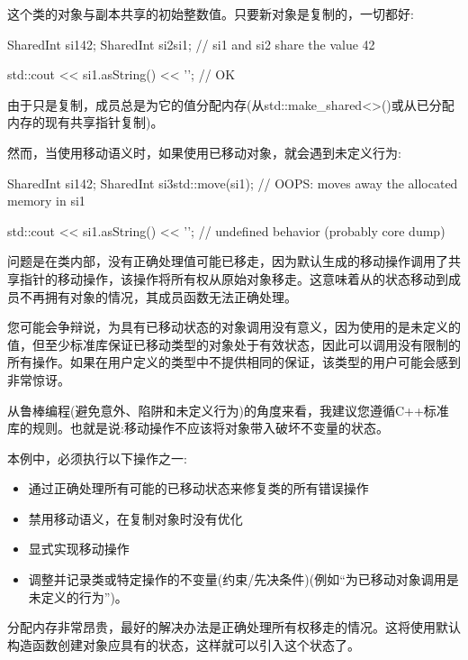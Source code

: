 这个类的对象与副本共享的初始整数值。只要新对象是复制的，一切都好:

\begin{cppcode}
SharedInt si1{42};
SharedInt si2{si1}; // si1 and si2 share the value 42

std::cout << si1.asString() << '\n'; // OK
\end{cppcode}

由于只是复制，成员总是为它的值分配内存(从std::make_shared<>()或从已分配内存的现有共享指针复制)。

然而，当使用移动语义时，如果使用已移动对象，就会遇到未定义行为:

\begin{cppcode}
SharedInt si1{42};
SharedInt si3{std::move(si1)}; // OOPS: moves away the allocated memory in si1

std::cout << si1.asString() << '\n'; // undefined behavior (probably core dump)
\end{cppcode}

问题是在类内部，没有正确处理值可能已移走，因为默认生成的移动操作调用了共享指针的移动操作，该操作将所有权从原始对象移走。这意味着从的状态移动到成员不再拥有对象的情况，其成员函数无法正确处理。

您可能会争辩说，为具有已移动状态的对象调用没有意义，因为使用的是未定义的值，但至少标准库保证已移动类型的对象处于有效状态，因此可以调用没有限制的所有操作。如果在用户定义的类型中不提供相同的保证，该类型的用户可能会感到非常惊讶。

从鲁棒编程(避免意外、陷阱和未定义行为)的角度来看，我建议您遵循C++标准库的规则。也就是说:移动操作不应该将对象带入破坏不变量的状态。

本例中，必须执行以下操作之一:

\begin{itemize}
	\item 通过正确处理所有可能的已移动状态来修复类的所有错误操作
	\item 禁用移动语义，在复制对象时没有优化
	\item 显式实现移动操作
	\item 调整并记录类或特定操作的不变量(约束/先决条件)(例如“为已移动对象调用是未定义的行为”)。
\end{itemize}

分配内存非常昂贵，最好的解决办法是正确处理所有权移走的情况。这将使用默认构造函数创建对象应具有的状态，这样就可以引入这个状态了。

